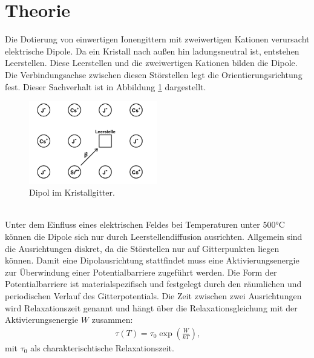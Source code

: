 \section{Theorie}
\label{sec:Theorie}
Die Dotierung von einwertigen Ionengittern mit zweiwertigen Kationen verursacht elektrische Dipole.
Da ein Kristall nach außen hin ladungsneutral ist, entstehen Leerstellen. Diese Leerstellen und die zweiwertigen
Kationen bilden die Dipole. Die Verbindungsachse zwischen diesen Störstellen legt die Orientierungsrichtung
fest. Dieser Sachverhalt ist in Abbildung \ref{fig:kristall} dargestellt.
\begin{figure}
    \centering
    \includegraphics[width=0.5\textwidth]{kristall.PNG}
    \caption{Dipol im Kristallgitter.\cite{skript}}
    \label{fig:kristall}
\end{figure}\\
Unter dem Einfluss eines elektrischen Feldes bei Temperaturen unter $500\si{\celsius}$ können die Dipole
sich nur durch Leerstellendiffusion ausrichten. Allgemein sind die Ausrichtungen diskret, da die Störstellen
nur auf Gitterpunkten liegen können. Damit eine Dipolausrichtung stattfindet muss eine Aktivierungsenergie
zur Überwindung einer Potentialbarriere zugeführt werden.
Die Form der Potentialbarriere ist materialspezifisch und festgelegt durch den räumlichen und periodischen
Verlauf des Gitterpotentials. Die Zeit zwischen zwei Ausrichtungen wird Relaxationszeit genannt und hängt über
die Relaxationsgleichung mit der Aktivierungsenergie $W$ zusammen:
\begin{align}
 \tau(T) =\tau_\mathrm{0}\exp\left({\frac{W}{kT}}\right) \label{eqn:relaxationsgleichung}\text{,}
\end{align}
mit $\tau_\mathrm{0}$ als charakterischtische Relaxationszeit.

